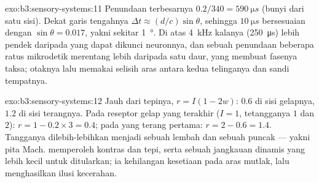 \begin{solution}{exo:b3:sensory-systems:11}
Penundaan terbesarnya $0.2/340 = \qty{590}{\micro s}$ (bunyi dari satu sisi).
Dekat garis tengahnya $\Delta t \approx (d/c)\sin\theta$, sehingga $\qty{10}{\micro
s}$ bersesuaian dengan $\sin\theta = 0.017$, yakni sekitar \qty{1}{\degree}. Di atas
\qty{4}{kHz} kalanya (\qty{250}{\micro s}) lebih pendek daripada yang dapat dikunci
neuronnya, dan sebuah penundaan beberapa ratus mikrodetik merentang
lebih daripada satu daur, yang membuat fasenya taksa; otaknya lalu memakai
selisih aras antara kedua telinganya dan sandi tempatnya.
\end{solution}

\begin{solution}{exo:b3:sensory-systems:12}
Jauh dari tepinya, $r = I(1 - 2w)$: $0.6$ di sisi gelapnya, $1.2$ di sisi
terangnya. Pada reseptor gelap yang terakhir ($I = 1$, tetangganya $1$ dan $2$): $r
= 1 - 0.2\times 3 = 0.4$; pada yang terang pertama: $r = 2 - 0.6 = 1.4$.
Tangganya dilebih-lebihkan menjadi sebuah lembah dan sebuah puncak --- yakni pita
Mach.  memperoleh kontras dan tepi, serta sebuah jangkauan dinamis yang lebih kecil
untuk ditularkan; ia kehilangan kesetiaan pada aras mutlak, lalu menghasilkan
ilusi kecerahan.
\end{solution}

